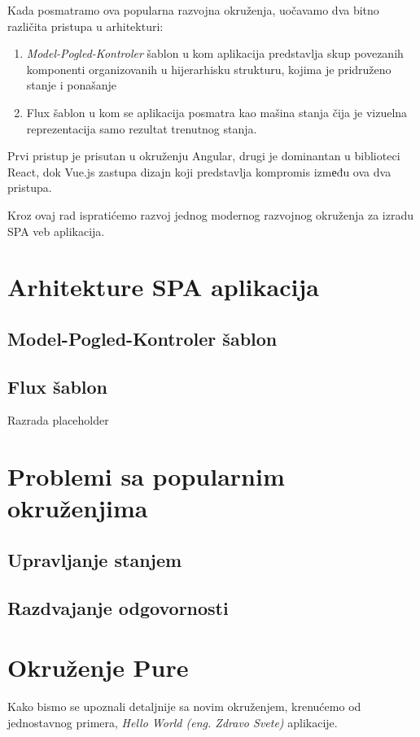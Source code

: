 \documentclass[12pt,oneside]{memoir}
\begin{document}
Kada posmatramo ova popularna razvojna okruženja, uočavamo dva bitno različita pristupa u arhitekturi:
\begin{enumerate}
  \item {\emph{Model-Pogled-Kontroler}} šablon u kom aplikacija predstavlja skup povezanih komponenti organizovanih u hijerarhisku strukturu, kojima je pridruženo stanje i ponašanje
  \item Flux šablon u kom se aplikacija posmatra kao mašina stanja čija je vizuelna reprezentacija samo rezultat trenutnog stanja.
\end{enumerate}

Prvi pristup je prisutan u okruženju Angular, drugi je dominantan u biblioteci React, dok Vue.js zastupa dizajn koji predstavlja kompromis izmеđu ova dva pristupa.

Kroz ovaj rad ispratićemo razvoj jednog modernog razvojnog okruženja za izradu SPA veb aplikacija.


\chapter{Arhitekture SPA aplikacija}
\section{Model-Pogled-Kontroler šablon}

\section{Flux šablon}
Razrada placeholder
\chapter{Problemi sa popularnim okruženjima}
\section{Upravljanje stanjem}
\section{Razdvajanje odgovornosti}
\chapter{Okruženje Pure}
Kako bismo se upoznali detaljnije sa novim okruženjem, krenućemo od jednostavnog
primera, \emph{Hello World (eng. Zdravo Svete)} aplikacije. 
\end{document}
